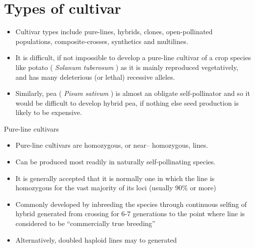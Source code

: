 \documentclass[11pt,ignorenonframetext,aspectratio=169]{beamer}
\providecommand{\tightlist}{%
  \setlength{\itemsep}{0pt}\setlength{\parskip}{0pt}}
\begin{document}
\hypertarget{types-of-cultivar}{%
\section{Types of cultivar}\label{types-of-cultivar}}

\begin{frame}{}
\protect\hypertarget{section-19}{}
\begin{itemize}
\tightlist
\item
  Cultivar types include pure-lines, hybrids, clones, open-pollinated
  populations, composite-crosses, synthetics and multilines.
\item
  It is difficult, if not impossible to develop a pure-line cultivar of
  a crop species like potato ( \emph{Solanum tuberosum} ) as it is
  mainly reproduced vegetatively, and has many deleterious (or lethal)
  recessive alleles.
\item
  Similarly, pea ( \emph{Pisum sativum} ) is almost an obligate
  self-pollinator and so it would be difficult to develop hybrid pea, if
  nothing else seed production is likely to be expensive.
\end{itemize}
\end{frame}

\begin{frame}{Pure-line cultivars}
\protect\hypertarget{pure-line-cultivars}{}
\begin{itemize}
\tightlist
\item
  Pure-line cultivars are homozygous, or near-- homozygous, lines.
\item
  Can be produced most readily in naturally self-pollinating species.
\item
  It is generally accepted that it is normally one in which the line is
  homozygous for the vast majority of its loci (usually 90\% or more)
\item
  Commonly developed by inbreeding the species through continuous
  selfing of hybrid generated from crossing for 6-7 generations to the
  point where line is considered to be ``commercially true breeding''
\item
  Alternatively, doubled haploid lines may to generated
\end{itemize}
\end{frame}
\end{document}
